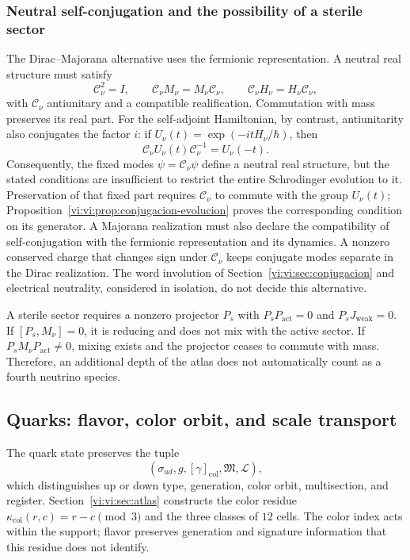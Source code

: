 \subsubsection{Neutral self-conjugation and the possibility of a sterile sector}

The Dirac--Majorana alternative uses the fermionic representation. A
neutral real structure must satisfy
\[
 \mathcal C_\nu^2=I,\qquad
 \mathcal C_\nu M_\nu=M_\nu\mathcal C_\nu,\qquad
 \mathcal C_\nu H_\nu=H_\nu\mathcal C_\nu,
\]
with \(\mathcal C_\nu\) antiunitary and a compatible realification.
Commutation with mass preserves its real part. For the self-adjoint
Hamiltonian, by contrast, antiunitarity also conjugates the factor
\(i\): if \(U_\nu(t)=\exp(-itH_\nu/\hbar)\), then
\[
 \mathcal C_\nu U_\nu(t)\mathcal C_\nu^{-1}=U_\nu(-t).
\]
Consequently, the fixed modes \(\psi=\mathcal C_\nu\psi\) define a
neutral real structure, but the stated conditions are insufficient to
restrict the entire Schrodinger evolution to it. Preservation of
that fixed part requires \(\mathcal C_\nu\) to commute with the group
\(U_\nu(t)\); Proposition~\ref{vi:vi:prop:conjugacion-evolucion}
proves the corresponding condition on its generator. A
Majorana realization must also declare the compatibility of
self-conjugation with the fermionic representation and its dynamics.
A nonzero conserved charge that changes
sign under \(\mathcal C_\nu\) keeps conjugate modes separate
in the Dirac realization. The word involution of
Section~\ref{vi:vi:sec:conjugacion} and electrical neutrality, considered
in isolation, do not decide this alternative.

A sterile sector requires a nonzero projector \(P_s\) with
\(P_sP_{\mathrm{act}}=0\) and \(P_sJ_{\text{weak}}=0\).
If \([P_s,M_\nu]=0\), it is reducing and does not mix with the active sector.
If \(P_sM_\nu P_{\mathrm{act}}\ne0\), mixing exists and the projector
ceases to commute with mass. Therefore, an additional depth of the
atlas does not automatically count as a fourth neutrino species.

\subsection{Quarks: flavor, color orbit, and scale transport}
\label{vi:vi:subsec:quarks-familias}

The quark state preserves the tuple
\[
 (\sigma_{ud},g,[\gamma]_{\mathrm{col}},\mathfrak M,\mathscr L),
\]
which distinguishes up or down type, generation, color orbit,
multisection, and register. Section~\ref{vi:vi:sec:atlas} constructs the
color residue \(\kappa_{\mathrm{col}}(r,c)=r-c\pmod3\) and the
three classes of \(12\) cells. The color index acts within the
support; flavor preserves generation and signature information that this
residue does not identify.

